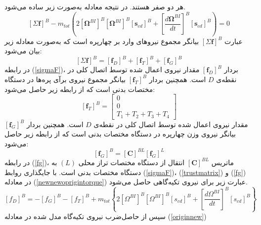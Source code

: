 هر دو صفر هستند. در نتیجه معادله به‌صورت زیر ساده می‌شود.
\begin{equation}\label{newnewoprigintorque}
	\left[\Sigma \boldsymbol f\right]^B - 
	m_{tot}\left(2
	\left[\boldsymbol\Omega^{BI}\right]^B
	\left[\boldsymbol\Omega^{BI}\right]^B
	\left[\boldsymbol s_{cd}\right]^B+
	\left[\dfrac{d\boldsymbol\Omega^{BI}}{dt}\right]^B
	\left[\boldsymbol s_{cd}\right]^B
	\right) = 0
\end{equation}
عبارت 
$\left[\Sigma \boldsymbol f\right]^B$
بیانگر مجموع نیروهای وارد بر چهارپره است که به‌صورت معادله زیر بیان می‌شود:
\begin{equation}\label{sigmaF}
	\left[\Sigma \boldsymbol f\right]^B = \left[\boldsymbol f_D\right]^B+\left[\boldsymbol f_T\right]^B+
	\left[\boldsymbol f_G\right]^B
\end{equation}
در رابطه 
(\ref{sigmaF})، بردار 
$\left[\boldsymbol f_D\right]^B$
مقدار نیروی اعمال‌ شده توسط اتصال کلی در نقطه‌ی
$D$
است. همچنین  بردار 
$\left[\boldsymbol f_T\right]^B$
بیانگر مجموع نیروی برآی پره‌ها در دستگاه مختصات بدنی است که از رابطه زیر حاصل می‌شود:
\begin{equation}\label{trustmatrix}
	\left[\boldsymbol f_T\right]^B = \begin{bmatrix}
		0\\0\\
		T_1+T_2+T_3+T_4
	\end{bmatrix}
\end{equation}
مقدار نیروی اعمال‌ شده توسط اتصال کلی در نقطه‌ی
$D$
است. همچنین  بردار 
$\left[\boldsymbol f_G\right]^B$
بیانگر نیروی وزن چهارپره در دستگاه مختصات بدنی است که از رابطه زیر حاصل می‌شود:
\begin{equation}\label{fg}
	\left[\boldsymbol f_G\right]^B = \left[\boldsymbol C\right]^{BL}
	\left[\boldsymbol f_G\right]^L
\end{equation}
در رابطه
(\ref{fg})،
ماتریس
$\left[\boldsymbol C\right]^{BL}$
 انتقال از دستگاه مختصات تراز محلی
$(L)$
 به دستگاه مختصات بدنی است. با جایگذاری روابط
(\ref{sigmaF})،
(\ref{trustmatrix}) و
(\ref{fg})
در معادله
(\ref{newnewoprigintorque})
عبارت زیر برای نیروی تكیه‌گاهی حاصل می‌شود.
\begin{equation}\label{originnew}
	\left[f_D\right]^B = 
	-\left[f_G\right]^B-
	\left[f_T\right]^B+
	m_{tot}\left\{2
	\left[\Omega^{BI}\right]^B
	\left[\Omega^{BI}\right]^B
	\left[s_{cd}\right]^B+
	\left[\dfrac{d\Omega^{BI}}{dt}\right]^B
	\left[s_{cd}\right]^B
	\right\}
\end{equation}
سپس از حاصل‌ضرب نیروی تكیه‌گاه مدل‌ شده در معادله
(\ref{originnew})
